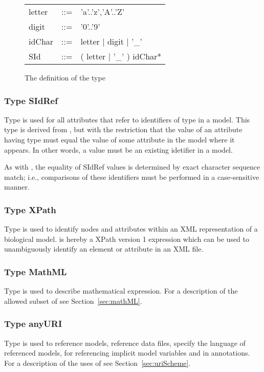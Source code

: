 \begin{figure}[hbt]
  \ttfamily
  \small
  \centering
  \begin{tabular}{lll}
    letter & ::= & 'a'..'z','A'..'Z'\\
    digit  & ::= & '0'..'9'\\
    idChar & ::= & letter | digit | '\_'\\
    SId    & ::= & ( letter | '\_' ) idChar*\\
  \end{tabular}
  \vspace*{-1ex}
  \caption{The definition of the type }
  \label{fig:sid}
\end{figure}


\subsubsection{Type SIdRef}
\label{type:sidref}
Type  is used for all attributes that refer to identifiers of type  in a model. This type is derived from , but with the restriction that the value of an attribute having type  must equal the value of some  attribute in the model where it appears. In other words, a  value must be an existing idetifier in a model. 

As with , the equality of SIdRef values is determined by exact character sequence match; i.e., comparisons of these identifiers must be performed in a case-sensitive manner.

\subsubsection{Type XPath}
\label{type:xpath}
Type  is used to identify nodes and attributes within an XML representation of a biological model.  is hereby a XPath version 1 expression which can be used to unambiguously identify an element or attribute in an XML file.

\subsubsection{Type MathML}
\label{type:mathml}
Type  is used to describe mathematical expression. For a description of the allowed subset of  see Section~\ref{sec:mathML}.

\subsubsection{Type anyURI}
\label{type:anyURI}
Type  is used to reference models, reference data files, specify the language of referenced models, for referencing implicit model variables and in annotations. For a description of the uses of  see Section~\ref{sec:uriScheme}.

